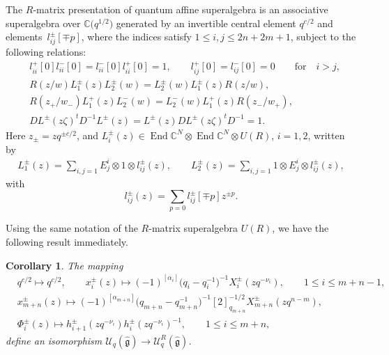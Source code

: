 \documentclass[10pt,a4paper]{amsart}
\numberwithin{equation}{section}
\newtheorem{Corollary}[Theorem]{Corollary}
\begin{document}
\begin{Definition}The $R$-matrix presentation of quantum affine superalgebra  is an associative superalgebra over $\mathbb{C}\bigl(q^{1/2}\bigr)$ generated by an invertible central element $q^{c/2}$ and elements~$l_{ij}^{\pm}[\mp p]$, where the indices satisfy $ 1\leq i,j\leq2n+2m+1$,
 subject to the following relations:
\begin{align*}
 &l^+_{ii}[0]l^-_{ii}[0]=l^-_{ii}[0] l^+_{ii}[0]=1, \qquad l^+_{ij}[0]=l^-_{ij}[0]=0\qquad \text{for} \quad i>j,\\
 &R(z/w)L_1^{\pm}(z)L_2^{\pm}(w)=L_2^{\pm}(w)L_1^{\pm}(z) R(z/w),\\
 &R(z_+/w_-)L_1^{+}(z)L_2^{-}(w)=L_2^{-}(w)L_1^{+}(z) R(z_-/w_+),\\
 &DL^{\pm}(z\zeta)^tD^{-1}L^{\pm}(z)=L^{\pm}(z)DL^{\pm}(z\zeta)^tD^{-1}=1.
\end{align*}
Here
 $z_{\pm}=zq^{\pm c/2}$, and $L_i^{\pm}(z)\in \operatorname{End}\mathbb{C}^N\otimes \operatorname{End}\mathbb{C}^N\otimes
 U(R)$, $i=1,2$, written by
\begin{gather*}
 L_1^{\pm}(z)=\sum\limits_{i,j=1}E^i_j\otimes1\otimes l_{ij}^{\pm}(z),\qquad
 L_2^{\pm}(z)=\sum\limits_{i,j=1}1\otimes E^i_j\otimes l_{ij}^{\pm}(z),
\end{gather*}with
\begin{equation*}
 l_{ij}^{\pm}(z)=\sum\limits_{p=0}l_{ij}^{\pm}[\mp p]z^{\pm p}.
\end{equation*}
\end{Definition}

 Using the same notation of the $R$-matrix superalgebra $U(R)$, we have the following result immediately.

\begin{Corollary} The mapping
\begin{align*}
 &q^{c/2}\mapsto q^{c/2},\qquad
 x_i^{\pm}(z)\mapsto(-1)^{[\alpha_i]}\bigl(q_i-q_i^{-1}\bigr)^{-1}X_i^{\pm}(zq^{-\nu_i}),\qquad 1\leq i\leq m+n-1,\\
 &x_{m+n}^{\pm}(z)\mapsto(-1)^{[\alpha_{m+n}]}\bigl(q_{m+n}-q_{m+n}^{-1}\bigr)^{-1}[2]_{q_{m+n}}^{-1/2}X_{m+n}^{\pm}(zq^{n-m}),\\
 &\Phi^{\pm}_{i}(z)\mapsto h_{i+1}^{\pm}(zq^{-\nu_i})h_{i}^{\pm}(zq^{-\nu_i})^{-1},\qquad 1\leq i\leq m+n,
\end{align*}
define an isomorphism $\mathcal{U}_q(\mathfrak{\hat{g}})\rightarrow\mathcal{U}_q^{R}(\mathfrak{\hat{g}})$.
\end{Corollary}
\end{document}
